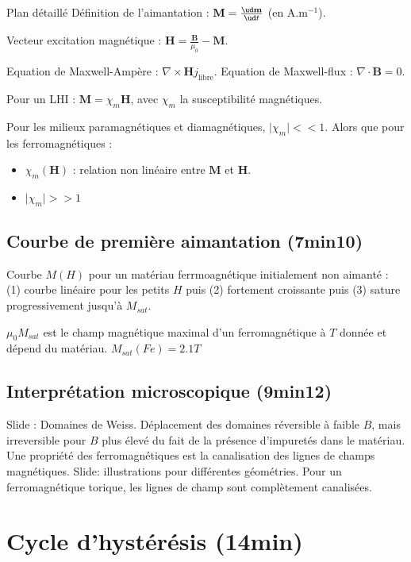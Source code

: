 \begin{reportBlock}{Plan détaillé}
Définition de l'aimantation : $\mathbf M = \frac{\ud \mathbf m}{\ud t}$ (en A.m$^{-1}$).

Vecteur excitation magnétique : $\mathbf H = \frac{\mathbf B}{\mu_0} - \mathbf M$. 

Equation de Maxwell-Ampère : $\nabla \times \mathbf H j_{\text{libre}}$.
Equation de Maxwell-flux : $\nabla \cdot \mathbf B = 0$.

Pour un LHI : $\mathbf M = \chi_m \mathbf H$, avec $\chi_m$ la susceptibilité magnétiques.

Pour les milieux paramagnétiques et diamagnétiques, $\mid\chi_m \mid << 1$. Alors que pour les ferromagnétiques : 
\begin{itemize}
    \item $\chi_m(\mathbf H)$ : relation non linéaire entre $\mathbf M$ et $\mathbf H$.
    \item $\mid\chi_m \mid >> 1$
\end{itemize}

\subsection{Courbe de première aimantation (7min10)}

Courbe $M(H)$ pour un matériau ferrmoagnétique initialement non aimanté : (1) courbe linéaire pour les petits $H$ puis (2) fortement croissante puis (3) sature progressivement jusqu'à $M_{sat}$.

$\mu_0 M_{sat}$ est le champ magnétique maximal d'un ferromagnétique à $T$ donnée et dépend du matériau. $M_{sat}(Fe) = 2.1 T$


\subsection{Interprétation microscopique (9min12)}
Slide : Domaines de Weiss. Déplacement des domaines réversible à faible $B$, mais irreversible pour $B$ plus élevé du fait de la présence d'impuretés dans le matériau.\\

Une propriété des ferromagnétiques est la canalisation des lignes de champs magnétiques. Slide: illustrations pour différentes géométries. Pour un ferromagnétique torique, les lignes de champ sont complètement canalisées.

\section{Cycle d'hystérésis (14min)}


\end{reportBlock}
